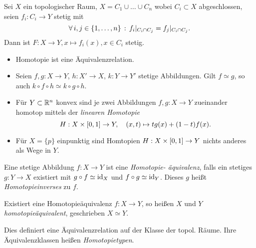 \documentclass{cheat-sheet}
\begin{document}
\begin{lem}
  Sei $X$ ein topologischer Raum, $X = C_1 \cup \ldots \cup C_n$ wobei $C_i \subset X$ abgeschlossen, seien $f_i : C_i \to Y$ stetig mit
  \[ \forall \, {i, j \in \{ 1, \ldots, n \}} \,:\, f_i|_{C_i \cap C_j} = f_j|_{C_i \cap C_j}. \]
  Dann ist $F : X \to Y, x \mapsto f_i(x), x \in C_i$ stetig.
\end{lem}

\begin{prop}
  \begin{itemize}
    \item Homotopie ist eine Äquivalenzrelation.
    \item Seien $f, g : X \to Y$, $h : X' \to X$, $k : Y \to Y'$ stetige Abbildungen. Gilt $f \simeq g$, so auch $k \circ f \circ h \simeq k \circ g \circ h$.
  \end{itemize}
\end{prop}

\begin{bsp}
  \begin{itemize}
    \item Für $Y \subset \mathbb{R}^n$ konvex sind je zwei Abbildungen $f, g : X \to Y$ zueinander homotop mittels der \emph{linearen Homotopie}
    \[ H : X \times \left[ 0, 1 \right] \to Y, \quad (x, t) \mapsto t g(x) + (1-t) f(x). \]
    \item Für $X = \{ p \}$ einpunktig sind Homtopien $H : X \times \left[ 0, 1 \right] \to Y$ nichts anderes als Wege in $Y$. %
  \end{itemize}
\end{bsp}

\begin{defn}
  Eine stetige Abbildung $f : X \to Y$ ist eine \emph{Homotopie- äquivalenz}, falls ein stetiges $g : Y \to X$ existiert mit $g \circ f \simeq \mathrm{id}_X$ und $f \circ g \simeq \mathrm{id}_Y$. Dieses $g$ heißt \emph{Homotopieinverses} zu $f$.
\end{defn}

\begin{defn}
  Existiert eine Homotopieäquivalenz $f : X \to Y$, so heißen $X$ und $Y$ \emph{homotopieäquivalent}, geschrieben $X \simeq Y$.
\end{defn}

\begin{bem}
  Dies definiert eine Äquivalenzrelation auf der Klasse der topol. Räume. Ihre Äquivalenzklassen heißen \emph{Homotopietypen}.
\end{bem}
\end{document}
